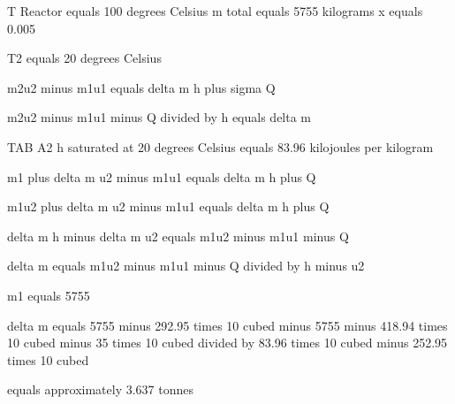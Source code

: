T Reactor equals 100 degrees Celsius  
m total equals 5755 kilograms  
x equals 0.005  

T2 equals 20 degrees Celsius  

m2u2 minus m1u1 equals delta m h plus sigma Q  

m2u2 minus m1u1 minus Q divided by h equals delta m  

TAB A2  
h saturated at 20 degrees Celsius equals 83.96 kilojoules per kilogram  

m1 plus delta m u2 minus m1u1 equals delta m h plus Q  

m1u2 plus delta m u2 minus m1u1 equals delta m h plus Q  

delta m h minus delta m u2 equals m1u2 minus m1u1 minus Q  

delta m equals m1u2 minus m1u1 minus Q divided by h minus u2  

m1 equals 5755  

delta m equals 5755 minus 292.95 times 10 cubed minus 5755 minus 418.94 times 10 cubed minus 35 times 10 cubed divided by 83.96 times 10 cubed minus 252.95 times 10 cubed  

equals approximately 3.637 tonnes